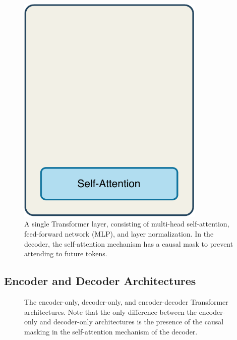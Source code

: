 \begin{figure}[h!]
    \centering
    \includegraphics[width=0.8\textwidth]{fig/transformer_layer.pdf}
    \caption{A single Transformer layer, consisting of multi-head self-attention, feed-forward network (MLP), and layer normalization. In the decoder, the self-attention mechanism has a causal mask to prevent attending to future tokens.}
    \label{fig:transformer_layer}
\end{figure}


\subsection{Encoder and Decoder Architectures}\label{subsec:types_transformers}


\begin{figure}[h!]
    \centering


    \caption{The encoder-only, decoder-only, and encoder-decoder Transformer architectures. Note that the only difference between the encoder-only and decoder-only architectures is the presence of the causal masking in the self-attention mechanism of the decoder.}
\end{figure}

